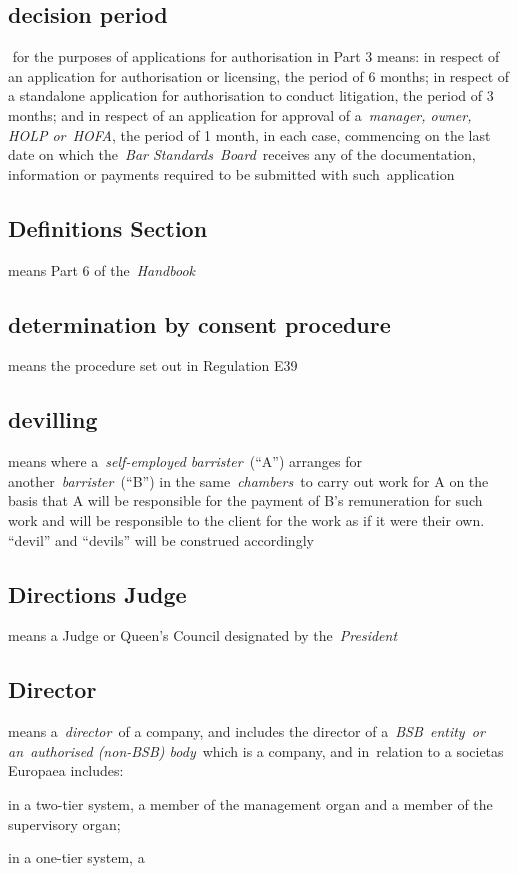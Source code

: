   \subsection{decision period} for the purposes of applications for
  authorisation in Part 3 means: in respect of an application for
  authorisation or licensing, the period of 6 months; in respect of a
  standalone application for authorisation to conduct litigation, the
  period of 3 months; and in respect of an application for approval of
  a~\emph{manager, owner, HOLP or~HOFA}, the period of 1 month, in each
  case, commencing on the last date on which the~\emph{Bar
  Standards~Board}~receives any of the documentation, information or
  payments required to be submitted with such~application  \subsection{Definitions Section } means Part 6 of the~\emph{Handbook} \subsection{determination by consent procedure } means the procedure set
  out in Regulation E39  \subsection{devilling } means where a~\emph{self-employed
  barrister~}(``A'') arranges for another~\emph{barrister~}(``B'') in
  the same~\emph{chambers~}to carry out work for A on the basis that A
  will be responsible for the payment of B's remuneration for such work
  and will be responsible to the client for the work as if it were their
  own. ``devil'' and ``devils'' will be construed accordingly  \subsection{Directions Judge } means a Judge or Queen's Council
  designated by the~\emph{President} \subsection{Director } means a~\emph{director~}of a company, and includes
  the director of a~\emph{BSB~entity~or an~authorised (non-BSB)
  body}~which is a company, and in~relation to a societas Europaea
  includes: \al \item in a two-tier system, a member of the management organ
  and a member of the supervisory organ; \item in a one-tier system, a
